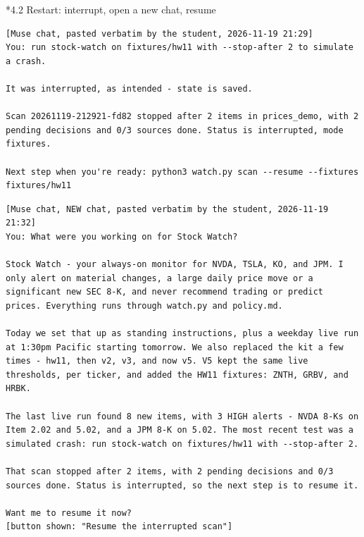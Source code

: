 \documentclass[11pt]{article}
\makeatletter
\renewcommand\subsection{\@startsection{subsection}{2}{\z@}{-2.2ex \@plus -1ex \@minus -.2ex}{0.8ex \@plus.2ex}{\normalfont\fontsize{12}{14.5}\selectfont\bfseries}}
\makeatother
\begin{document}
\subsection*{4.2 Restart: interrupt, open a new chat, resume}
\begingroup\lstset{basicstyle=\ttfamily\tiny}
\begin{lstlisting}
[Muse chat, pasted verbatim by the student, 2026-11-19 21:29]
You: run stock-watch on fixtures/hw11 with --stop-after 2 to simulate a crash.

It was interrupted, as intended - state is saved.

Scan 20261119-212921-fd82 stopped after 2 items in prices_demo, with 2 pending decisions and 0/3 sources done. Status is interrupted, mode fixtures.

Next step when you're ready: python3 watch.py scan --resume --fixtures fixtures/hw11
\end{lstlisting}
\endgroup
\begingroup\lstset{basicstyle=\ttfamily\tiny}
\begin{lstlisting}
[Muse chat, NEW chat, pasted verbatim by the student, 2026-11-19 21:32]
You: What were you working on for Stock Watch?

Stock Watch - your always-on monitor for NVDA, TSLA, KO, and JPM. I only alert on material changes, a large daily price move or a significant new SEC 8-K, and never recommend trading or predict prices. Everything runs through watch.py and policy.md.

Today we set that up as standing instructions, plus a weekday live run at 1:30pm Pacific starting tomorrow. We also replaced the kit a few times - hw11, then v2, v3, and now v5. V5 kept the same live thresholds, per ticker, and added the HW11 fixtures: ZNTH, GRBV, and HRBK.

The last live run found 8 new items, with 3 HIGH alerts - NVDA 8-Ks on Item 2.02 and 5.02, and a JPM 8-K on 5.02. The most recent test was a simulated crash: run stock-watch on fixtures/hw11 with --stop-after 2.

That scan stopped after 2 items, with 2 pending decisions and 0/3 sources done. Status is interrupted, so the next step is to resume it.

Want me to resume it now?
[button shown: "Resume the interrupted scan"]
\end{lstlisting}
\endgroup
\begingroup\lstset{basicstyle=\ttfamily\tiny}
\end{document}
